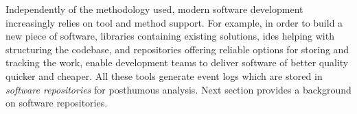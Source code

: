 Independently of the methodology used, modern software development increasingly relies on tool and method support. For example, in order to build a new piece of software, libraries containing existing solutions, \glspl{ide} helping with structuring the codebase, and repositories offering reliable options for storing and tracking the work, enable development teams to deliver software of better quality quicker and cheaper. All these tools generate event logs which are stored in \emph{software repositories} for posthumous analysis. Next section provides a background on software repositories. 

%
%
%
%
%
%
%
